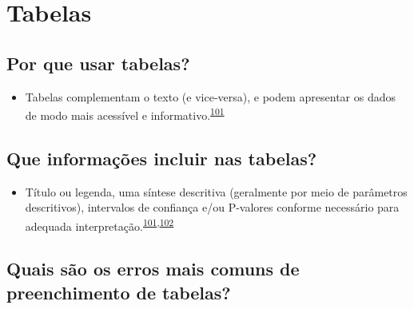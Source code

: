 \documentclass[
  a4paper,
]{book}
\providecommand{\tightlist}{%
  \setlength{\itemsep}{0pt}\setlength{\parskip}{0pt}}
\begin{document}
\hypertarget{tabelas}{%
\section{Tabelas}\label{tabelas}}

\hypertarget{por-que-usar-tabelas}{%
\subsection{Por que usar tabelas?}\label{por-que-usar-tabelas}}

\begin{itemize}
\tightlist
\item
  Tabelas complementam o texto (e vice-versa), e podem apresentar os dados de modo mais acessível e informativo.\textsuperscript{\protect\hyperlink{ref-Inskip2017}{101}}
\end{itemize}

\hypertarget{que-informauxe7uxf5es-incluir-nas-tabelas}{%
\subsection{Que informações incluir nas tabelas?}\label{que-informauxe7uxf5es-incluir-nas-tabelas}}

\begin{itemize}
\tightlist
\item
  Título ou legenda, uma síntese descritiva (geralmente por meio de parâmetros descritivos), intervalos de confiança e/ou P-valores conforme necessário para adequada interpretação.\textsuperscript{\protect\hyperlink{ref-Inskip2017}{101},\protect\hyperlink{ref-Kwak2021}{102}}
\end{itemize}

\hypertarget{quais-suxe3o-os-erros-mais-comuns-de-preenchimento-de-tabelas}{%
\subsection{Quais são os erros mais comuns de preenchimento de tabelas?}\label{quais-suxe3o-os-erros-mais-comuns-de-preenchimento-de-tabelas}}
\end{document}
